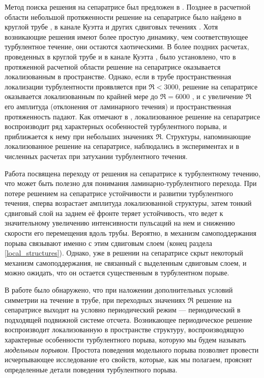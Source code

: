 Метод поиска решения на сепаратрисе был предложен в \cite{Skufca2006}. Позднее в расчетной области небольшой протяженности решение на сепаратрисе было найдено в круглой трубе \cite{Schneider2007}, в канале Куэтта \cite{Schneider2008} и других сдвиговых течениях \cite{Kreilos2013}. Хотя возникающие решения имеют более простую динамику, чем соответствующее турбулентное течение, они остаются хаотическими. В более поздних расчетах, проведенных в круглой трубе \cite{Mellibovsky2009transition} и в канале Куэтта \cite{Duguet2009}, было установлено, что в протяженной расчетной области решение на сепаратрисе оказывается локализованным в пространстве. Однако, если в трубе пространственная локализации турбулентности проявляется при $\Re < 3000$, решение на сепаратрисе оказывается локализованным по крайней мере до $\Re = 6000$ \cite{Duguet2010}, и с увеличение $\Re$ его амплитуда (отклонения от ламинарного течения) и пространственная протяженность падают. Как отмечают в \cite{Duguet2010, Avila2013}, локализованное решение на сепаратрисе воспроизводит ряд характерных особенностей турбулентного порыва, и приближается к нему при небольших значениях $\Re$. Структуры, напоминающие локализованное решение на сепаратрисе, наблюдались в экспериментах \cite{deLozar2012} и в численных расчетах \cite{Manneville2011} при затухании турбулентного течения. 

Работа \cite{Duguet2010} посвящена переходу от решения на сепаратрисе к турбулентному течению, что может быть полезно для понимания ламинарно-турбулентного перехода. При потере решением на сепаратрисе устойчивости и развитии турбулентного течения, сперва возрастает амплитуда локализованной структуры, затем тонкий сдвиговый слой на заднем её фронте теряет устойчивость, что ведет к значительному увеличению интенсивности пульсаций на нем и снижению скорости его перемещения вдоль трубы. Вероятно, в \cite{Shimizu2009, Hof2010} механизм самоподдержания порыва связывают именно с этим сдвиговым слоем (конец раздела \ref{local_structures}). Однако, уже в решении на сепаратрисе скрыт некоторый механизм самоподдержания, не связанный с выделенным сдвиговым слоем, и можно ожидать, что он остается существенным в турбулентном порыве. 

В работе \cite{Avila2013} было обнаружено, что при наложении дополнительных условий симметрии на течение в трубе, при переходных значениях $\Re$ решение на сепаратрисе выходит на условно периодический режим --- периодический в подходящей подвижной системе отсчета. Возникающее периодическое решение воспроизводит локализованную в пространстве структуру, воспроизводящую характерные особенности турбулентного порыва, которую мы будем называть {\it модельным порывом}. Простота поведения модельного порыва позволяет провести исчерпывающее исследование его свойств, которые, как мы полагаем, прояснят определенные детали поведения турбулентного порыва. 

